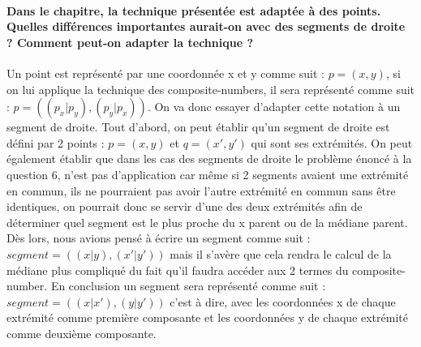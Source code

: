 \documentclass{article}
\begin{document}
    \paragraph{Dans le chapitre, la technique présentée est adaptée à des points. Quelles différences
    importantes aurait-on avec des segments de droite ? Comment peut-on adapter la technique ?}
    Un point est représenté par une coordonnée x et y comme suit : $p = (x,y)$, si on lui applique la technique des composite-numbers, il sera
    représenté comme suit : $p = ((p_x|p_y),(p_y|p_x))$. On va donc essayer d'adapter cette notation à un segment de droite. Tout d'abord, 
    on peut établir qu'un segment de droite est défini par 2 points : $p = (x,y)$ et $q=(x',y')$ qui sont ses extrémités. On peut également
    établir que dans les cas des segments de droite le problème énoncé à la question 6, n'est pas d'application car même si 2 segments avaient
    une extrémité en commun, ils ne pourraient pas avoir l'autre extrémité en commun sans être identiques, on pourrait donc se servir d'une 
    des deux extrémités afin de déterminer quel segment est le plus proche du x parent ou de la médiane parent. Dès lors, nous avions pensé
    à écrire un segment comme suit : $segment = ((x|y),(x'|y'))$ mais il s'avère que cela rendra le calcul de la médiane plus compliqué du fait
    qu'il faudra accéder aux 2 termes du composite-number. En conclusion un segment sera représenté comme suit : $segment = ((x|x'),(y|y'))$ c'est à dire,
    avec les coordonnées x de chaque extrémité comme première composante et les coordonnées y de chaque extrémité comme deuxième composante.
\end{document}

